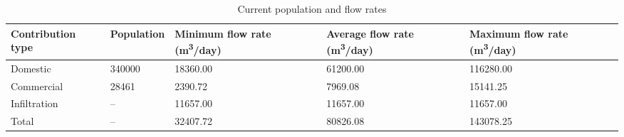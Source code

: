 \begin{table}[h]
  \centering
  \caption{Current population and flow rates}
  \label{tab:current_rates}
  \begin{tabular}{|p{3cm}|p{2.5cm}|p{3cm}|p{3cm}|p{3cm}|}
    \hline
    \textbf{Contribution type} & \textbf{Population} & \textbf{Minimum flow rate (m\textsuperscript{3}/day)} & \textbf{Average flow rate (m\textsuperscript{3}/day)} & \textbf{Maximum flow rate (m\textsuperscript{3}/day)} \\
    \hline
    Domestic & 340000 & 18360.00 & 61200.00 & 116280.00 \\
    Commercial & 28461 & 2390.72 & 7969.08 & 15141.25 \\
    Infiltration & -- & 11657.00 & 11657.00 & 11657.00 \\
    Total & -- & 32407.72 & 80826.08 & 143078.25 \\
    \hline
  \end{tabular}
\end{table}
